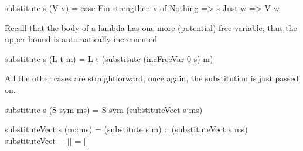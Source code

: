 \begin{code}
substitute s (V v) =  case Fin.strengthen v of
                        Nothing => s
                        Just w  => V w
\end{code}

Recall that the body of a lambda has one more (potential) free-variable, thus the upper bound is
automatically incremented

\begin{code}
substitute s (L t m) = L t (substitute (incFreeVar 0 s) m)
\end{code}

All the other cases are straightforward, once again, the substitution is just passed on.

\begin{code}
substitute s (S sym ms) = S sym (substituteVect s ms)

substituteVect s (m::ms) = (substitute s m) :: (substituteVect s ms)
substituteVect _ [] = []
\end{code}
